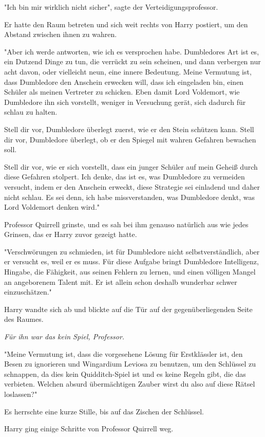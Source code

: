 {"Ich bin mir wirklich nicht sicher", sagte der Verteidigungsprofessor.

Er hatte den Raum betreten und sich weit rechts von Harry postiert, um den Abstand zwischen ihnen zu wahren.

"Aber ich werde antworten, wie ich es versprochen habe. Dumbledores Art ist es, ein Dutzend Dinge zu tun, die verrückt zu sein scheinen, und dann verbergen nur acht davon, oder vielleicht neun, eine innere Bedeutung. Meine Vermutung ist, dass Dumbledore den Anschein erwecken will, dass ich eingeladen bin, einen Schüler als meinen Vertreter zu schicken. Eben damit Lord Voldemort, wie Dumbledore ihn sich vorstellt, weniger in Versuchung gerät, sich dadurch für schlau zu halten.

Stell dir vor, Dumbledore überlegt zuerst, wie er den Stein schützen kann. Stell dir vor, Dumbledore überlegt, ob er den Spiegel mit wahren Gefahren bewachen soll.

Stell dir vor, wie er sich vorstellt, dass ein junger Schüler auf mein Geheiß durch diese Gefahren stolpert. Ich denke, das ist es, was Dumbledore zu vermeiden versucht, indem er den Anschein erweckt, diese Strategie sei einladend und daher nicht schlau. Es sei denn, ich habe missverstanden, was Dumbledore denkt, was Lord Voldemort denken wird."

Professor Quirrell grinste, und es sah bei ihm genauso natürlich aus wie jedes Grinsen, das er Harry zuvor gezeigt hatte.

"Verschwörungen zu schmieden, ist für Dumbledore nicht selbstverständlich, aber er versucht es, weil er es muss. Für diese Aufgabe bringt Dumbledore Intelligenz, Hingabe, die Fähigkeit, aus seinen Fehlern zu lernen, und einen völligen Mangel an angeborenem Talent mit. Er ist allein schon deshalb wunderbar schwer einzuschätzen."

Harry wandte sich ab und blickte auf die Tür auf der gegenüberliegenden Seite des Raumes.

\emph{Für ihn war das kein Spiel, Professor.}

"Meine Vermutung ist, dass die vorgesehene Lösung für Erstklässler ist, den Besen zu ignorieren und Wingardium Leviosa zu benutzen, um den Schlüssel zu schnappen, da dies kein Quidditch-Spiel ist und es keine Regeln gibt, die das verbieten. Welchen absurd übermächtigen Zauber wirst du also auf diese Rätsel loslassen?"

Es herrschte eine kurze Stille, bis auf das Zischen der Schlüssel.

Harry ging einige Schritte von Professor Quirrell weg.

}
